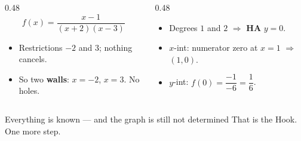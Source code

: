 \documentclass[aspectratio=169, 11pt]{beamer}
\begin{document}
\begin{frame}[t, plain]
  \begin{columns}[T]
    \begin{column}{0.48\textwidth}
      \[ f(x)=\frac{x-1}{(x+2)(x-3)} \]
      \begin{itemize}\setlength{\itemsep}{3pt}
        \item Restrictions $-2$ and $3$; nothing cancels.
        \item So two \textbf{walls}: $x=-2$, $x=3$. No holes.
      \end{itemize}
    \end{column}
    \begin{column}{0.48\textwidth}
      \begin{itemize}\setlength{\itemsep}{3pt}
        \item Degrees $1$ and $2$ $\Rightarrow$ \textbf{HA} $y=0$.
        \item $x$-int: numerator zero at $x=1$ $\Rightarrow$ $(1,0)$.
        \item $y$-int: $f(0)=\dfrac{-1}{-6}=\dfrac16$.
      \end{itemize}
    \end{column}
  \end{columns}
  \vspace{8pt}
  \begin{block}{Everything is known --- and the graph is still not determined}
    \centering That is the Hook. One more step.
  \end{block}
\end{frame}
\end{document}
